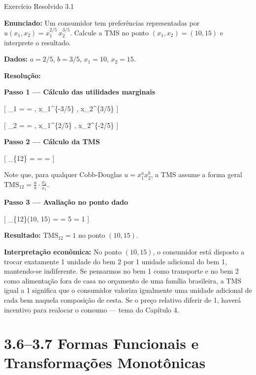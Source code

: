 \documentclass[11pt,twoside,openright]{book}
\begin{document}
\begin{exresolvidobox}{Exercício Resolvido 3.1}

\textbf{Enunciado:} Um consumidor tem preferências representadas por
\(u(x_1, x_2) = x_1^{2/5} \, x_2^{3/5}\). Calcule a TMS no ponto
\((x_1, x_2) = (10, 15)\) e interprete o resultado.

\textbf{Dados:} \(a = 2/5\), \(b = 3/5\), \(x_1 = 10\), \(x_2 = 15\).

\textbf{Resolução:}

\textbf{Passo 1 --- Cálculo das utilidades marginais}

{[} \_1 =  =  ,
x\_1\^{}\{-3/5\} , x\_2\^{}\{3/5\} {]}

{[} \_2 =  =  ,
x\_1\^{}\{2/5\} , x\_2\^{}\{-2/5\} {]}

\textbf{Passo 2 --- Cálculo da TMS}

{[} \_\{12\} =  =
=  \cdot {} {]}

Note que, para qualquer Cobb-Douglas \(u = x_1^a x_2^b\), a TMS assume a
forma geral \(\text{TMS}_{12} = \frac{a}{b} \cdot \frac{x_2}{x_1}\).

\textbf{Passo 3 --- Avaliação no ponto dado}

{[} \_\{12\}(10, 15) =  \cdot {} =
 5 = 1 {]}

\textbf{Resultado:} \(\text{TMS}_{12} = 1\) no ponto \((10, 15)\).

\textbf{Interpretação econômica:} No ponto \((10, 15)\), o consumidor
está disposto a trocar exatamente 1 unidade do bem 2 por 1 unidade
adicional do bem 1, mantendo-se indiferente. Se pensarmos no bem 1 como
transporte e no bem 2 como alimentação fora de casa no orçamento de uma
família brasileira, a TMS igual a 1 significa que o consumidor valoriza
igualmente uma unidade adicional de cada bem naquela composição de
cesta. Se o preço relativo diferir de 1, haverá incentivo para realocar
o consumo --- tema do Capítulo 4.

\end{exresolvidobox}

\chapter{3.6--3.7 Formas Funcionais e Transformações
Monotônicas}\label{formas-funcionais-e-transformauxe7uxf5es-monotuxf4nicas}
\end{document}
